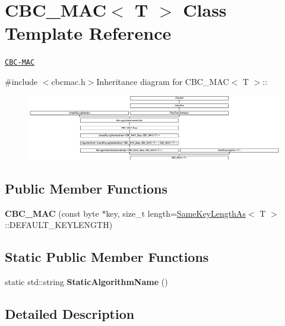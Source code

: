 \hypertarget{class_c_b_c___m_a_c}{
\section{CBC\_\-MAC$<$ T $>$ Class Template Reference}
\label{class_c_b_c___m_a_c}
}


\href{http://www.weidai.com/scan-mirror/mac.html#CBC-MAC}{\tt CBC-\/MAC}  


{\ttfamily \#include $<$cbcmac.h$>$}Inheritance diagram for CBC\_\-MAC$<$ T $>$::\begin{figure}[H]
\begin{center}
\leavevmode
\includegraphics[height=2.83784cm]{class_c_b_c___m_a_c}
\end{center}
\end{figure}
\subsection*{Public Member Functions}
\begin{DoxyCompactItemize}
\item 
\hypertarget{class_c_b_c___m_a_c_af6b2e38e87f5146cbd5ec54c3d4f6352}{
{\bfseries CBC\_\-MAC} (const byte $\ast$key, size\_\-t length=\hyperlink{class_same_key_length_as}{SameKeyLengthAs}$<$ T $>$::DEFAULT\_\-KEYLENGTH)}
\label{class_c_b_c___m_a_c_af6b2e38e87f5146cbd5ec54c3d4f6352}

\end{DoxyCompactItemize}
\subsection*{Static Public Member Functions}
\begin{DoxyCompactItemize}
\item 
\hypertarget{class_c_b_c___m_a_c_a0f55085f835ad9d5303d88f2ff52257d}{
static std::string {\bfseries StaticAlgorithmName} ()}
\label{class_c_b_c___m_a_c_a0f55085f835ad9d5303d88f2ff52257d}

\end{DoxyCompactItemize}


\subsection{Detailed Description}
